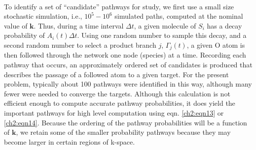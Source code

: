 \paragraph{}
To identify a set of “candidate” pathways for study, we first
use a small size stochastic simulation, i.e., $10^5-10^6$ simulated
paths, computed at the nominal value of $\mathbf{k}$. Thus, during a time
interval $\Delta t$, a given molecule of $S_i$ has a decay probability of
$A_i(t) \Delta t$. Using one random number to sample this decay, and a
second random number to select a product branch $j$, $\Gamma_j(t)$, a
given O atom is then followed through the network one node
(species) at a time. Recording each pathway that occurs, an
approximately ordered set of candidates is produced that
describes the passage of a followed atom to a given target. For
the present problem, typically about 100 pathways were
identified in this way, although many fewer were needed to
converge the targets. Although this calculation is not efficient
enough to compute accurate pathway probabilities, it does yield
the important pathways for high level computation using eqn. \ref{ch2:eqn13}
or \ref{ch2:eqn14}. Because the ordering of the pathway probabilities will be
a function of $\mathbf{k}$, we retain some of the smaller probability
pathways because they may become larger in certain regions of
k-space.
\newline
